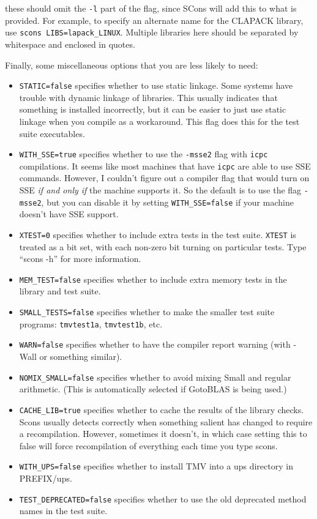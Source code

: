 \documentclass[twoside,letterpaper,11pt]{article}
\begin{document}
\begin{enumerate}
\begin{itemize}
these should omit the \texttt{-l} part of the flag, since SCons will add this to what is provided.
For example, to specify an alternate name for the CLAPACK library, use 
\texttt{scons LIBS=lapack\_LINUX}.  Multiple libraries here should be separated by 
whitespace and enclosed in quotes.
\end{itemize}
Finally, some miscellaneous options that you are less likely to need:
\begin{itemize}
\item \texttt{STATIC=false} specifies whether to use static linkage.  Some systems have trouble with
dynamic linkage of libraries.  This usually indicates that something is installed incorrectly, but
it can be easier to just use static linkage when you compile as a workaround.  This flag does this
for the test suite executables.
\item \texttt{WITH\_SSE=true} specifies whether to use the \texttt{-msse2} flag with \texttt{icpc} compilations. 
It seems like most machines that have \texttt{icpc} are able to use SSE commands.  However, 
I couldn't figure out a compiler flag that would turn on SSE {\em if and only if} the machine
supports it.  So the default is to use the flag \texttt{-msse2}, but you can disable it by setting 
\texttt{WITH\_SSE=false} if your machine doesn't have SSE support.
\item \texttt{XTEST=0} specifies whether to include extra tests in the test suite.  \texttt{XTEST}
is treated as a bit set, with each non-zero bit turning on particular tests.  Type ``scons -h'' for 
more information.

\item \texttt{MEM\_TEST=false} specifies whether to include extra memory tests in the library and test suite.
\item \texttt{SMALL\_TESTS=false} specifies whether to make the smaller test suite programs: \texttt{tmvtest1a}, \texttt{tmvtest1b}, etc. 
\item \texttt{WARN=false} specifies whether to have the compiler report warning (with -Wall or
something similar).
\item \texttt{NOMIX\_SMALL=false} specifies whether to avoid mixing Small and regular arithmetic.  
(This is automatically selected if GotoBLAS is being used.)
\item \texttt{CACHE\_LIB=true} specifies whether to cache the results of the library checks.  Scons
usually detects correctly when something salient has changed to require a recompilation.  However,
sometimes it doesn't, in which case setting this to false will force recompilation of everything each
time you type scons.
\item \texttt{WITH\_UPS=false} specifies whether to install TMV into a ups directory in PREFIX/ups.
\item \texttt{TEST\_DEPRECATED=false} specifies whether to use the old deprecated method
names in the test suite.
\end{itemize}


\end{enumerate}
\end{document}
